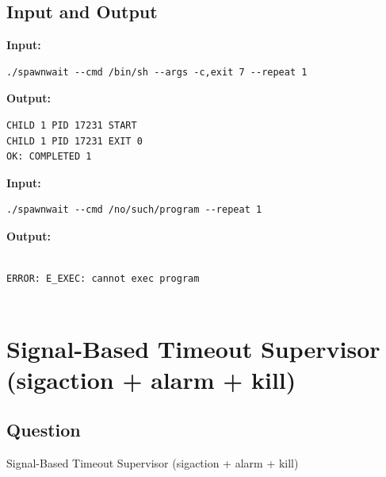 \documentclass[12pt,a4paper]{article}
\begin{document}
\subsection{Input and Output}
\noindent\textbf{Input:}
\begin{verbatim}
./spawnwait --cmd /bin/sh --args -c,exit 7 --repeat 1 
\end{verbatim}
\vspace{0.5cm}
\noindent\textbf{Output:}
\begin{verbatim}
CHILD 1 PID 17231 START
CHILD 1 PID 17231 EXIT 0
OK: COMPLETED 1

\end{verbatim}


\noindent\textbf{Input:}
\begin{verbatim}
./spawnwait --cmd /no/such/program --repeat 1
\end{verbatim}
\vspace{0.5cm}
\noindent\textbf{Output:}
\begin{verbatim}

ERROR: E_EXEC: cannot exec program
               
\end{verbatim}
\newpage

\section{Signal-Based Timeout Supervisor (sigaction + alarm + kill)}
\subsection{Question}
Signal-Based Timeout Supervisor (sigaction + alarm + kill)
\end{document}
